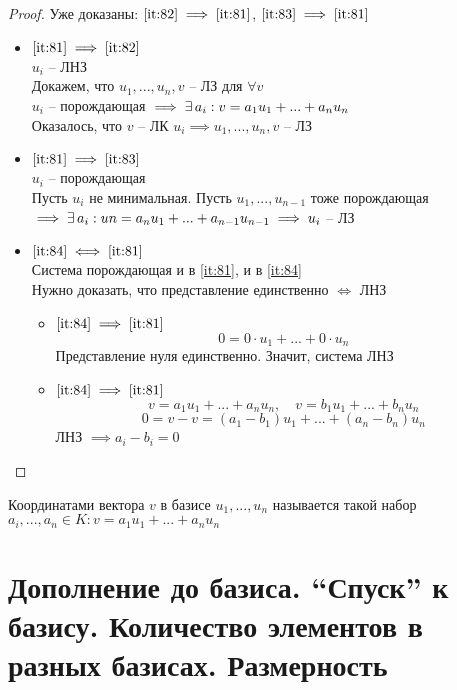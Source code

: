 \begin{proof}
    Уже доказаны: $ \ref{it:82} \implies \ref{it:81} $, $ \ref{it:83} \implies \ref{it:81} $
    \begin{itemize}
        \item $ \ref{it:81} \implies \ref{it:82} $ \\
        $ u_i $ -- ЛНЗ \\
        Докажем, что $ u_1, ..., u_n, v $ -- ЛЗ для $ \forall v $ \\
        $ u_i $ -- порождающая $ \implies \exists\, a_i : v = a_1u_1 + ... + a_nu_n $ \\
        Оказалось, что $v$ -- ЛК $u_i \implies u_1, ..., u_n, v $ -- ЛЗ
        \item $ \ref{it:81} \implies \ref{it:83} $ \\
        $ u_i $ -- порождающая \\
        Пусть $ u_i $ не минимальная. Пусть $ u_1, ..., u_{n - 1} $ тоже порождающая $ \implies \exists\, a_i : un = a_nu_1 + ... + a_{n - 1}u_{n - 1} \implies u_i $ -- ЛЗ
        \item $ \ref{it:84} \iff \ref{it:81} $ \\
        Система порождающая и в \ref{it:81}, и в \ref{it:84} \\
        Нужно доказать, что представление единственно $ \iff $ ЛНЗ
        \begin{itemize}
            \item $ \ref{it:84} \implies \ref{it:81} $
            $$ 0 = 0 \cdot u_1 + ... + 0 \cdot u_n $$
            Представление нуля единственно. Значит, система ЛНЗ
            \item $ \ref{it:84} \implies \ref{it:81} $
            $$ v = a_1u_1 + ... + a_nu_n, \quad v = b_1u_1 + ... + b_nu_n $$
            $$ 0 = v - v = (a_1 - b_1)u_1 + ... + (a_n - b_n)u_n $$
            ЛНЗ $ \implies a_i - b_i = 0 $
        \end{itemize}
    \end{itemize}
\end{proof}

\begin{definition}
	Координатами вектора $v$ в базисе $u_1, ..., u_n $ называется такой набор $ a_i, ..., a_n \in K : v = a_1u_1 + ... + a_nu_n $
\end{definition}

\section{Дополнение до базиса. ``Спуск'' к базису. Количество элементов в разных базисах. Размерность}

